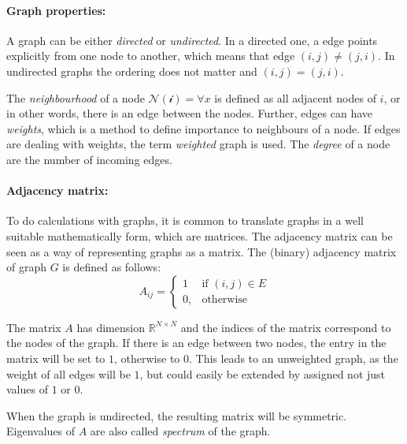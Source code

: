 \paragraph{Graph properties:}
A graph can be either \textit{directed} or \textit{undirected}. 
In a directed one, a edge points explicitly from one node to another, which means that edge $(i, j) \neq (j, i)$. 
In undirected graphs the ordering does not matter and  $(i, j) = (j, i)$.

The \textit{neighbourhood} of a node $\mathcal{N(i)} = \forall x $ is defined as all adjacent nodes 
of $i$, or in other words, there is an edge between the nodes. 
Further, edges can have \textit{weights}, which is a method to define importance to neighbours of a node.
If edges are dealing with weights, the term \textit{weighted} graph is used.
The \textit{degree} of a node are the number of incoming edges.

\paragraph{Adjacency matrix:}
To do calculations with graphs, it is common to translate graphs in a well suitable mathematically
form, which are matrices.
The adjacency matrix can be seen as a way of representing graphs as a matrix.
The (binary) adjacency matrix of graph $G$ is defined as follows:
\begin{equation}
    \label{eg:AdjacencyMatrix}
    A_{ij} =    
    \begin{cases}
        1  & \text{if } (i, j) \in E \\
        0, & \text{otherwise}
    \end{cases}
\end{equation}

The matrix $A$ has dimension $\mathbb{R}^{N \times N}$ and the indices of the matrix correspond to the nodes of the graph.
If there is an edge between two nodes, the entry in the matrix will be set to $1$, otherwise to $0$.
This leads to an unweighted graph, as the weight of all edges will be $1$, but could easily be extended by assigned not just values of $1$ or $0$. 

When the graph is undirected, the resulting matrix will be symmetric. 
Eigenvalues of $A$ are also called \textit{spectrum} of the graph.


